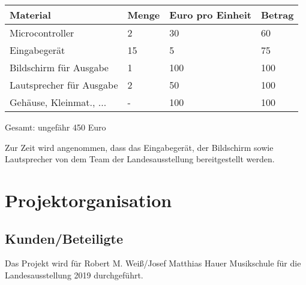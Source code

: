 \documentclass[a4paper]{scrartcl}
\begin{document}


\begin{center}
	\begin{tabular}{|l|l|l|l|}
		\hline
		Material & Menge & Euro pro Einheit & Betrag\\
		\hline
		Microcontroller & 2 & 30 & 60\\
		Eingabegerät & 15 & 5 & 75\\
		Bildschirm für Ausgabe & 1 & 100 & 100 \\
		Lautsprecher für Ausgabe & 2 & 50 & 100 \\
		Gehäuse, Kleinmat., ... & - & 100 & 100\\
		\hline
	\end{tabular}
\end{center}

\hspace{8,2cm}
Gesamt: ungefähr 450 Euro

\vspace{0,5cm}

\noindent Zur Zeit wird angenommen, dass das Eingabegerät, der Bildschirm sowie Lautsprecher von dem Team der Landesausstellung bereitgestellt werden.

\section{Projektorganisation}
\subsection{Kunden/Beteiligte}
Das Projekt wird für Robert M. Weiß/Josef Matthias Hauer Musikschule für die Landesausstellung 2019 durchgeführt.
\end{document}
